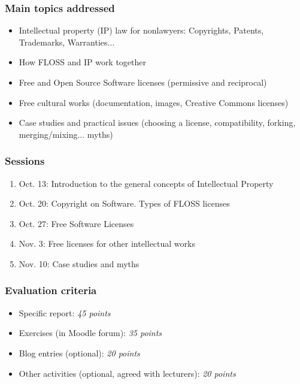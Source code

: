 
\begin{frame}
\frametitle{Main topics addressed}

\begin{itemize}
   \item Intellectual property (IP) law \alert{for nonlawyers}: Copyrights,
Patents, Trademarks, Warranties...
   \item How FLOSS and IP work together
   \item Free and Open Source Software licenses (permissive and reciprocal)
   \item Free cultural works (documentation, images, Creative Commons
licenses)
   \item Case studies and practical issues (choosing a license, compatibility,
forking, merging/mixing... myths)
\end{itemize}

\end{frame}



\begin{frame}
\frametitle{Sessions}

\begin{enumerate}
\item \alert{Oct. 13:} Introduction to the general concepts of Intellectual Property
\item \alert{Oct. 20:} Copyright on Software. Types of FLOSS licenses
\item \alert{Oct. 27:} Free Software Licenses
\item \alert{Nov. 3:} Free licenses for other intellectual works
\item \alert{Nov. 10:} Case studies and myths
\end{enumerate}

\end{frame}



\begin{frame}
\frametitle{Evaluation criteria}

\begin{itemize}
\item \alert{Specific report}: \textit{45 points}
\item \alert{Exercises} (in Moodle forum): \textit{35 points}
\item \alert{Blog entries} (optional): \textit{20 points} 
\item \alert{Other activities} (optional, agreed with lecturers): \textit{20 points} 
\end{itemize}

\end{frame}

